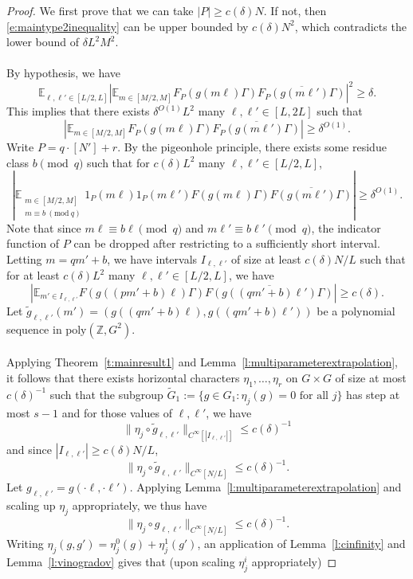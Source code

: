 \documentclass[11pt, a4paper]{amsart}
\newcommand{\nmod}[1]{~(\mathrm{mod}~#1)}
\theoremstyle{plain}
\theoremstyle{plain}
\theoremstyle{definition}
\theoremstyle{remark}
\numberwithin{equation}{section}
\numberwithin{lemma}{section}
\numberwithin{proposition}{section}
\numberwithin{corollary}{section}
\numberwithin{definition}{section}
\numberwithin{claim}{section}
\begin{document}
\begin{proof}
We first prove that we can take $|P| \ge c(\delta)N$. If not, then \eqref{e:maintype2inequality} can be upper bounded by $c(\delta)N^2$, which contradicts the lower bound of $\delta L^2M^2$. \\\\
By hypothesis, we have
$$\mathbb{E}_{\ell, \ell' \in [L/2, L]} |\mathbb{E}_{m \in [M/2, M]}  F_P(g(m\ell)\Gamma)\overline{F_P(g(m\ell')\Gamma)}|^2 \ge \delta.$$
This implies that there exists $\delta^{O(1)}L^2$ many $\ell, \ell' \in [L, 2L]$ such that
$$|\mathbb{E}_{m \in [M/2, M]}  F_P(g(m\ell)\Gamma)\overline{F_P(g(m\ell')\Gamma)}| \ge \delta^{O(1)}.$$
Write $P = q \cdot [N'] + r$. By the pigeonhole principle, there exists some residue class $b \pmod{q}$ such that for $c(\delta)L^2$ many $\ell, \ell' \in [L/2, L]$,
$$|\mathbb{E}_{\substack{m \in [M/2, M] \\ m \equiv b \nmod{q}}} 1_P(m\ell)1_P(m\ell') F(g(m\ell)\Gamma)\overline{F(g(m\ell')\Gamma)}| \ge \delta^{O(1)}.$$
Note that since $m\ell \equiv b\ell \pmod{q}$ and $m\ell' \equiv b\ell' \pmod{q}$, the indicator function of $P$ can be dropped after restricting to a sufficiently short interval. Letting $m = qm' + b$, we have intervals $I_{\ell, \ell'}$ of size at least $c(\delta)N/L$ such that for at least $c(\delta)L^2$ many $\ell, \ell' \in [L/2, L]$, we have
$$|\mathbb{E}_{m' \in I_{\ell, \ell'}} F(g((pm' + b)\ell)\Gamma)\overline{F(g((qm' + b)\ell')\Gamma)}| \ge c(\delta).$$
Let $\tilde{g}_{\ell, \ell'}(m') = (g((qm' + b)\ell), g((qm' + b)\ell'))$ be a polynomial sequence in $\mathrm{poly}(\mathbb{Z}, G^2)$. \\\\
Applying Theorem~\ref{t:mainresult1} and Lemma~\ref{l:multiparameterextrapolation}, it follows that there exists horizontal characters $\eta_1, \dots, \eta_r$ on $G \times G$ of size at most $c(\delta)^{-1}$ such that the subgroup $\tilde{G}_1 := \{g \in G_1: \eta_j(g) = 0 \text{ for all } j\}$ has step at most $s - 1$ and for those values of $\ell, \ell'$, we have
$$\|\eta_j \circ \tilde{g}_{\ell, \ell'}\|_{C^\infty[|I_{\ell, \ell'}|]} \le c(\delta)^{-1}$$
and since $|I_{\ell, \ell'}| \ge c(\delta)N/L$,
$$\|\eta_j \circ \tilde{g}_{\ell, \ell'}\|_{C^\infty[N/L]} \le c(\delta)^{-1}.$$
Let $g_{\ell, \ell'} = g(\cdot \ell, \cdot \ell')$. Applying Lemma~\ref{l:multiparameterextrapolation} and scaling up $\eta_j$ appropriately, we thus have
$$\|\eta_j \circ g_{\ell, \ell'}\|_{C^\infty[N/L]} \le c(\delta)^{-1}.$$
Writing $\eta_j(g, g') = \eta_j^0(g) + \eta_j^1(g')$, an application of Lemma~\ref{l:cinfinity} and Lemma~\ref{l:vinogradov}  gives that (upon scaling $\eta_j^i$ appropriately)

\end{proof}
\end{document}
